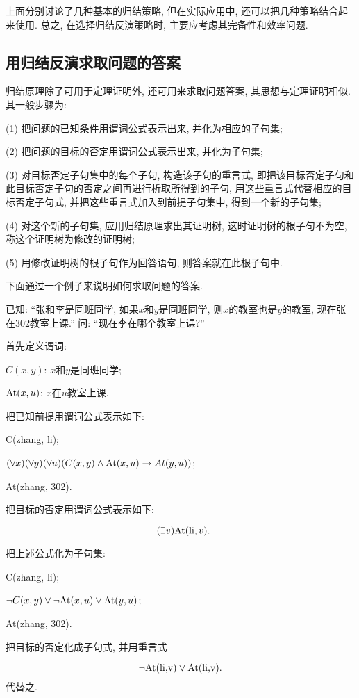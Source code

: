 上面分别讨论了几种基本的归结策略, 但在实际应用中, 还可以把几种策略结合起来使用.
总之, 在选择归结反演策略时, 主要应考虑其完备性和效率问题.
\subsection{用归结反演求取问题的答案}

归结原理除了可用于定理证明外, 还可用来求取问题答案, 其思想与定理证明相似. 其一般步骤为:

(1) 把问题的已知条件用谓词公式表示出来, 并化为相应的子句集;

(2) 把问题的目标的否定用谓词公式表示出来, 并化为子句集;

(3) 对目标否定子句集中的每个子句, 构造该子句的重言式, 即把该目标否定子句和此目标否定子句的否定之间再进行析取所得到的子句, 用这些重言式代替相应的目标否定子句式, 并把这些重言式加入到前提子句集中, 得到一个新的子句集;

(4) 对这个新的子句集, 应用归结原理求出其证明树, 这时证明树的根子句不为空, 称这个证明树为修改的证明树;

(5) 用修改证明树的根子句作为回答语句, 则答案就在此根子句中.

下面通过一个例子来说明如何求取问题的答案.
\begin{example}
已知: “张和李是同班同学, 如果$x$和$y$是同班同学, 则$x$的教室也是$y$的教室, 现在张在302教室上课.”
问: “现在李在哪个教室上课?”
\end{example}
\begin{result}
首先定义谓词:

$C(x, y)$:     $x$和$y$是同班同学;

$\textup{At}(x, u)$:    $x$在$u$教室上课.

把已知前提用谓词公式表示如下:

C(zhang, li);

$(\forall x) (\forall y) (\forall u) (C(x, y)\wedge \textup{At}(x, u)\rightarrow At(y,u))$;

\textup{At}(zhang, 302).

把目标的否定用谓词公式表示如下:

$$\neg (\exists  v)\textup{At}(\textup{li}, v).$$

把上述公式化为子句集:

\textup{C(zhang, li)};

$\neg C(x, y)\vee \neg \textup{At}(x, u)\vee \textup{At}(y, u)$;

\textup{At}(zhang, 302).

把目标的否定化成子句式, 并用重言式

    $$\neg \textup{At(li,v)} \vee \textup{At(li,v)}.$$
代替之.
\end{result}

